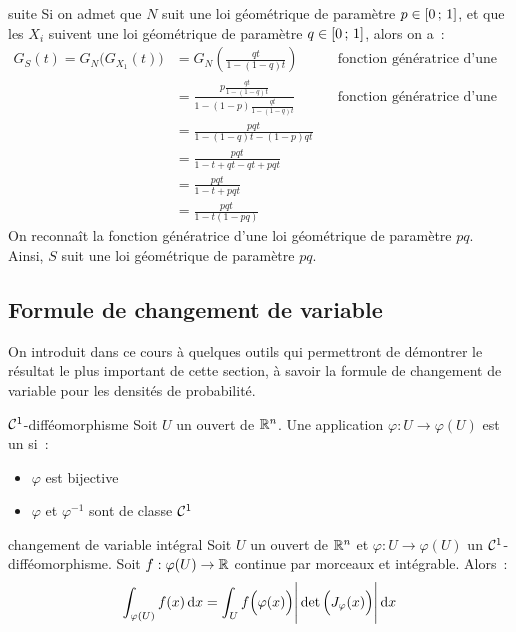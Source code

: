\begin{exemple}{}{suite}
    Si on admet que $N$ suit une loi géométrique de paramètre $p \in [0\, ; \, 1]$, et que les $X_i$ suivent une loi géométrique de paramètre $q \in [0\, ; \, 1]$, alors on a~:
    \begin{align*}
        G_S(t) = G_N\Big(G_{X_1}(t)\Big) &= G_N\left(\frac{qt}{1-(1-q)t}\right) \qquad &\text{fonction génératrice d'une loi géométrique}\\
        &= \frac{p\frac{qt}{1-(1-q)t}}{1-(1-p)\frac{qt}{1-(1-q)t}} \qquad &\text{fonction génératrice d'une loi géométrique}\\
        &= \frac{pqt}{1-(1-q)t - (1-p)qt}\\
        &= \frac{pqt}{1 - t + qt - qt + pqt}\\
        &= \frac{pqt}{1 - t + pqt}\\
        &= \frac{pqt}{1 - t(1-pq)}
    \end{align*}
    On reconnaît la fonction génératrice d'une loi géométrique de paramètre $pq$. Ainsi, $S$ suit une loi géométrique de paramètre $pq$.
\end{exemple}


\subsection{Formule de changement de variable}

On introduit dans ce cours à quelques outils qui permettront de démontrer le résultat le plus important de cette section, à savoir la formule de changement de variable pour les densités de probabilité.
\begin{definition}{}{$\mathcal{C}^1$-difféomorphisme}
    Soit $U$ un ouvert de $\mathbb{R}^n$. Une application $\varphi : U \to \varphi(U)$ est un  si~:
    \begin{itemize}
        \item $\varphi$ est bijective
        \item $\varphi$ et $\varphi^{-1}$ sont de classe $\mathcal{C}^1$
    \end{itemize}
\end{definition}

\begin{theoreme}{}{changement de variable intégral}
    Soit $U$ un ouvert de $\mathbb{R}^n$ et $\varphi : U \to \varphi(U)$ un $\mathcal{C}^1$-difféomorphisme.
   Soit $f : \varphi(U) \to \mathbb{R}$ continue par morceaux et intégrable. Alors~:
   $$\int_{\varphi(U)} f(x)\,\mathrm{d}x = \int_U f\Big(\varphi(x)\Big) \Bigg\vert \det\Big(J_\varphi(x)\Big)\Bigg\vert \,\mathrm{d}x$$
\end{theoreme}

